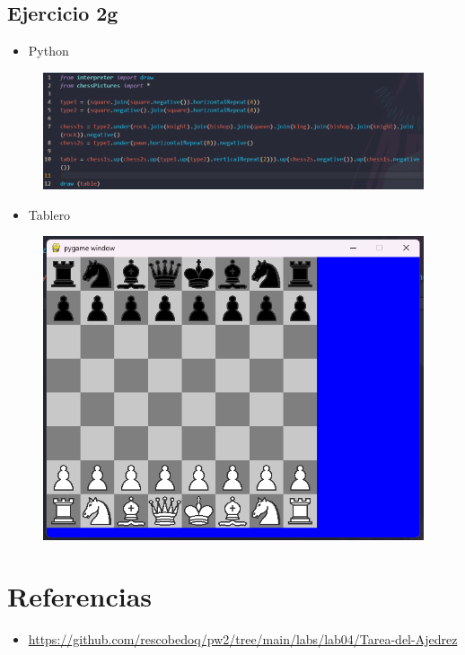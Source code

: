 \documentclass{article}
\begin{document}
	\subsection{Ejercicio 2g}
	\begin{itemize}
		\item Python
	\end{itemize}
	\begin{figure}[H]
		\centering
		\includegraphics[width=1.0\textwidth, keepaspectratio]{img/ejercicio2g}
	\end{figure}
	\begin{itemize}
		\item Tablero
	\end{itemize}
	\begin{figure}[H]
		\centering
		\includegraphics[width=1.0\textwidth, keepaspectratio]{img/ejercicio2gg}
	\end{figure}
	
	
	
	
	\clearpage
	
	\section{Referencias}
	\begin{itemize}			
		\item \url{https://github.com/rescobedoq/pw2/tree/main/labs/lab04/Tarea-del-Ajedrez}
	\end{itemize}	
	
	
\end{document}

